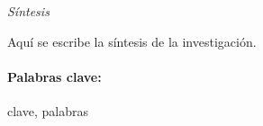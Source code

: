 \clearpage 
{}  %

\thispagestyle{empty}
\begin{center}
	\setlength{\parskip}{0pt}
	\bigskip
	{\large{\textit{Síntesis}} \par}
	\bigskip
\end{center}

Aquí se escribe la síntesis de la investigación.

\paragraph{Palabras clave:} clave, palabras
